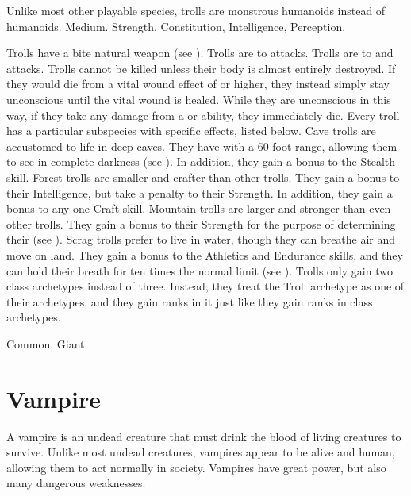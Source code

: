    Unlike most other playable species, trolls are monstrous humanoids instead of humanoids.
   Medium.
    Strength,  Constitution,  Intelligence,  Perception.
  \begin{raggeditemize}
     Trolls have a bite natural weapon (see ).
     Trolls are \resistant to \atPoison attacks.
     Trolls are \vulnerable to \atAcid and \atFire attacks.
     Trolls cannot be killed unless their body is almost entirely destroyed.
      If they would die from a vital wound effect of  or higher, they instead simply stay unconscious until the vital wound is healed.
      While they are unconscious in this way, if they take any damage from a \atAcid or \atFire ability, they immediately die.
     Every troll has a particular subspecies with specific effects, listed below.
       Cave trolls are accustomed to life in deep caves.
      They have  with a 60 foot range, allowing them to see in complete darkness (see ).
      In addition, they gain a  bonus to the Stealth skill.
       Forest trolls are smaller and crafter than other trolls.
      They gain a  bonus to their Intelligence, but take a  penalty to their Strength.
      In addition, they gain a  bonus to any one Craft skill.
       Mountain trolls are larger and stronger than even other trolls.
      They gain a  bonus to their Strength for the purpose of determining their  (see ).
       Scrag trolls prefer to live in water, though they can breathe air and move on land.
      They gain a  bonus to the Athletics and Endurance skills, and they can hold their breath for ten times the normal limit (see ).
     Trolls only gain two class archetypes instead of three.
      Instead, they treat the Troll archetype as one of their archetypes, and they gain ranks in it just like they gain ranks in class archetypes.
  \end{raggeditemize}
   Common, Giant.



\section{Vampire}\label{Vampire}
  A vampire is an undead creature that must drink the blood of living creatures to survive.
  Unlike most undead creatures, vampires appear to be alive and human, allowing them to act normally in society.
  Vampires have great power, but also many dangerous weaknesses.

